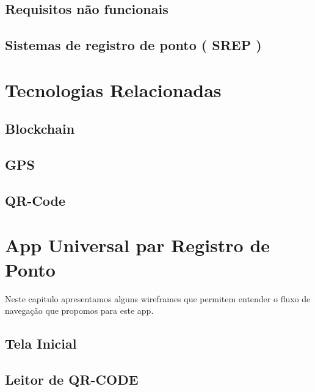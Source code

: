 \documentclass[12pt,openright,twoside,a4paper,english, brazil]{abntex2} %
\begin{document}
\section{Requisitos não funcionais}

\section{Sistemas de registro de ponto ( SREP )}









\chapter{Tecnologias Relacionadas}

\section{Blockchain}

\section{GPS}

\section{QR-Code}






\chapter{App Universal par Registro de Ponto}

Neste capitulo apresentamos alguns wireframes que permitem entender o fluxo de navegação que propomos para este app.

\section{Tela Inicial}

\section{Leitor de QR-CODE}
\end{document}
